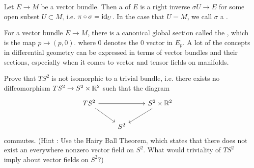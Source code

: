 %
\begin{defn}
Let $E \to M$ be a vector bundle. Then a  of $E$ is
a right inverse $\sigma U \to E$ for some open subset $U \subset M$, i.e.
$\pi \circ \sigma = \operatorname{id}_U$. In the case that $U = M$, we call $\sigma$ a
.
\end{defn}
%
For a vector bundle $E \to M$, there is a canonical global section called
the , which is the map $p \mapsto (p, 0)$. where $0$
denotes the $0$ vector in $E_p$. A lot of the concepts in differential
geometry can be expressed in terms of vector bundles and their sections,
especially when it comes to vector and tensor fields on manifolds.
%
\begin{exer}
	Prove that $TS^2$ is not isomorphic to a trivial bundle, i.e. there
	exists no diffeomorphism $TS^2 \to S^2 \times \mathbb{R}^2$ such that the
	diagram
	$$\begin{tikzcd}
	TS^2 \ar[dr]\ar[rr] && S^2 \times \R^2 \ar[dl]\\
	& S^2
	\end{tikzcd}$$
	commutes. (Hint : Use the Hairy Ball Theorem, which states that
	there does not exist an everywhere nonzero vector field on $S^2$.
	What would triviality of $TS^2$ imply about vector fields on $S^2$?)
\end{exer}
%

